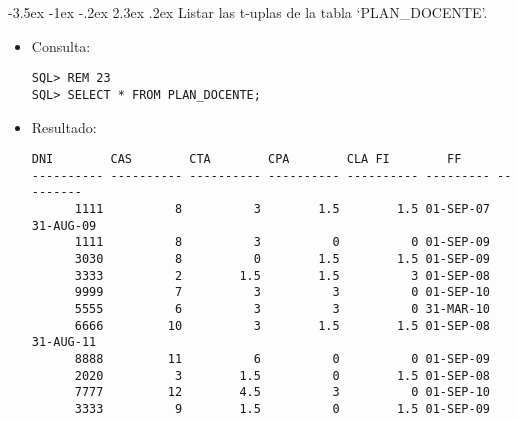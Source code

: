 \documentclass[11pt]{report}
\makeatletter
\renewcommand\chapter{\@startsection{chapter}{0}{\z@}%
    {-3.5ex \@plus -1ex \@minus -.2ex}%
    {2.3ex \@plus.2ex}%
    {\normalfont\Large\bfseries}}
\makeatother
\begin{document}
\chapter{Listar las t-uplas de la tabla ‘PLAN\_DOCENTE’.}
\begin{itemize}
  \item Consulta:
  \begin{verbatim}
SQL> REM 23
SQL> SELECT * FROM PLAN_DOCENTE;
  \end{verbatim}
  \item{Resultado:}
  \begin{verbatim}
DNI        CAS        CTA        CPA        CLA FI        FF                                                                                                                                     
---------- ---------- ---------- ---------- ---------- --------- ---------                                                                                                                              
      1111          8          3        1.5        1.5 01-SEP-07 31-AUG-09                                                                                                                              
      1111          8          3          0          0 01-SEP-09                                                                                                                                        
      3030          8          0        1.5        1.5 01-SEP-09                                                                                                                                        
      3333          2        1.5        1.5          3 01-SEP-08                                                                                                                                        
      9999          7          3          3          0 01-SEP-10                                                                                                                                        
      5555          6          3          3          0 31-MAR-10                                                                                                                                        
      6666         10          3        1.5        1.5 01-SEP-08 31-AUG-11                                                                                                                              
      8888         11          6          0          0 01-SEP-09                                                                                                                                        
      2020          3        1.5          0        1.5 01-SEP-08                                                                                                                                        
      7777         12        4.5          3          0 01-SEP-10                                                                                                                                        
      3333          9        1.5          0        1.5 01-SEP-09                                                                                                                                        


\end{verbatim}
\end{itemize}
\end{document}
